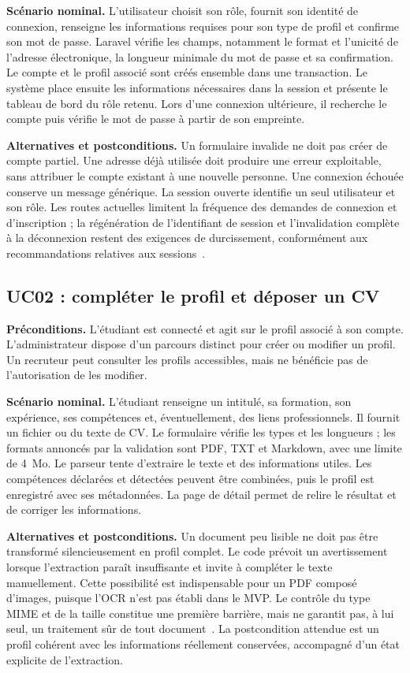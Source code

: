 \textbf{Scénario nominal.} L'utilisateur choisit son rôle, fournit son identité de connexion, renseigne les informations requises pour son type de profil et confirme son mot de passe. Laravel vérifie les champs, notamment le format et l'unicité de l'adresse électronique, la longueur minimale du mot de passe et sa confirmation. Le compte et le profil associé sont créés ensemble dans une transaction. Le système place ensuite les informations nécessaires dans la session et présente le tableau de bord du rôle retenu. Lors d'une connexion ultérieure, il recherche le compte puis vérifie le mot de passe à partir de son empreinte.

\textbf{Alternatives et postconditions.} Un formulaire invalide ne doit pas créer de compte partiel. Une adresse déjà utilisée doit produire une erreur exploitable, sans attribuer le compte existant à une nouvelle personne. Une connexion échouée conserve un message générique. La session ouverte identifie un seul utilisateur et son rôle. Les routes actuelles limitent la fréquence des demandes de connexion et d'inscription ; la régénération de l'identifiant de session et l'invalidation complète à la déconnexion restent des exigences de durcissement, conformément aux recommandations relatives aux sessions~\cite{owasp-session}.

\subsection{UC02 : compléter le profil et déposer un CV}

\textbf{Préconditions.} L'étudiant est connecté et agit sur le profil associé à son compte. L'administrateur dispose d'un parcours distinct pour créer ou modifier un profil. Un recruteur peut consulter les profils accessibles, mais ne bénéficie pas de l'autorisation de les modifier.

\textbf{Scénario nominal.} L'étudiant renseigne un intitulé, sa formation, son expérience, ses compétences et, éventuellement, des liens professionnels. Il fournit un fichier ou du texte de CV. Le formulaire vérifie les types et les longueurs ; les formats annoncés par la validation sont PDF, TXT et Markdown, avec une limite de 4~Mo. Le parseur tente d'extraire le texte et des informations utiles. Les compétences déclarées et détectées peuvent être combinées, puis le profil est enregistré avec ses métadonnées. La page de détail permet de relire le résultat et de corriger les informations.

\textbf{Alternatives et postconditions.} Un document peu lisible ne doit pas être transformé silencieusement en profil complet. Le code prévoit un avertissement lorsque l'extraction paraît insuffisante et invite à compléter le texte manuellement. Cette possibilité est indispensable pour un PDF composé d'images, puisque l'OCR n'est pas établi dans le MVP. Le contrôle du type MIME et de la taille constitue une première barrière, mais ne garantit pas, à lui seul, un traitement sûr de tout document~\cite{owasp-upload}. La postcondition attendue est un profil cohérent avec les informations réellement conservées, accompagné d'un état explicite de l'extraction.

